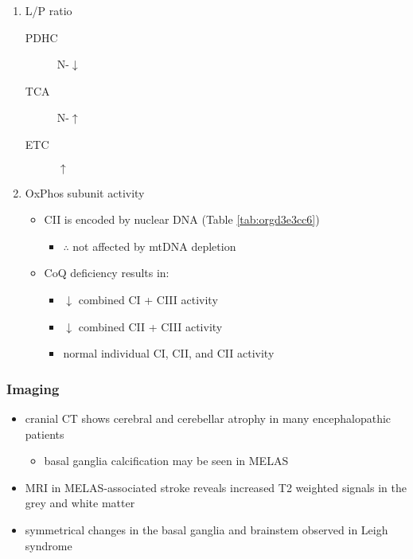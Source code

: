 \documentclass[12pt]{scrartcl}
\begin{document}
\begin{enumerate}
\item L/P ratio
\label{sec:org4b5e0fc}
\begin{description}
\item[{PDHC}] N-\(\downarrow\)
\item[{TCA}] N-\(\uparrow\)
\item[{ETC}] \(\uparrow\)
\end{description}
\item OxPhos subunit activity
\label{sec:orge3970f5}
\begin{itemize}
\item CII is encoded by nuclear DNA (Table \ref{tab:orgd3e3cc6})
\begin{itemize}
\item \(\therefore\) not affected by mtDNA depletion
\end{itemize}
\item CoQ deficiency results in:
\begin{itemize}
\item \(\downarrow\) combined CI + CIII activity
\item \(\downarrow\) combined CII + CIII activity
\item normal individual CI, CII, and CII activity
\end{itemize}
\end{itemize}
\end{enumerate}

\subsubsection{Imaging}
\label{sec:org7ed6372}
\begin{itemize}
\item cranial CT shows cerebral and cerebellar atrophy in many encephalopathic patients
\begin{itemize}
\item basal ganglia calcification may be seen in MELAS
\end{itemize}
\item MRI in MELAS-associated stroke reveals increased T2 weighted signals in the grey and white matter
\item symmetrical changes in the basal ganglia and brainstem observed in Leigh syndrome
\end{itemize}
\end{document}
